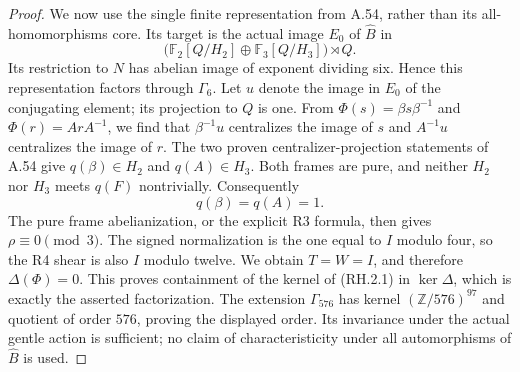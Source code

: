 \begin{proof}
We now use the single finite representation from A.54, rather
than its all-homomorphisms core.  Its target is the actual image
$E_0$ of $\widehat B$ in
\[
 \bigl(\mathbb F_2[Q/H_2]\oplus
             \mathbb F_3[Q/H_3]\bigr)\rtimes Q.
\]
Its restriction to $N$ has abelian image of exponent dividing
six. Hence this representation factors through $\Gamma_6$.
Let $u$ denote the image in $E_0$ of the conjugating element;
its projection to $Q$ is one.  From
$\Phi(s)=\beta s\beta^{-1}$ and $\Phi(r)=ArA^{-1}$,
we find that $\beta^{-1}u$ centralizes the image of $s$ and
$A^{-1}u$ centralizes the image of $r$.
The two proven centralizer-projection statements of A.54 give
$q(\beta)\in H_2$ and $q(A)\in H_3$.
Both frames are pure, and neither $H_2$ nor $H_3$ meets $q(F)$
nontrivially. Consequently
\[
 q(\beta)=q(A)=1.
\]
The pure frame abelianization, or the explicit R3 formula,
then gives $\rho\equiv0\pmod3$. The signed normalization
is the one equal to $I$ modulo four, so the R4 shear is also
$I$ modulo twelve. We obtain $T=W=I$, and therefore
$\Delta(\Phi)=0$.
This proves containment of the kernel of (RH.2.1) in
$\ker\Delta$, which is exactly the asserted factorization.
The extension $\Gamma_{576}$ has kernel
$(\mathbb Z/576)^{97}$ and quotient of order $576$, proving
the displayed order.  Its invariance under the actual gentle
action is sufficient; no claim of characteristicity under
all automorphisms of $\widehat B$ is used.
\end{proof}

